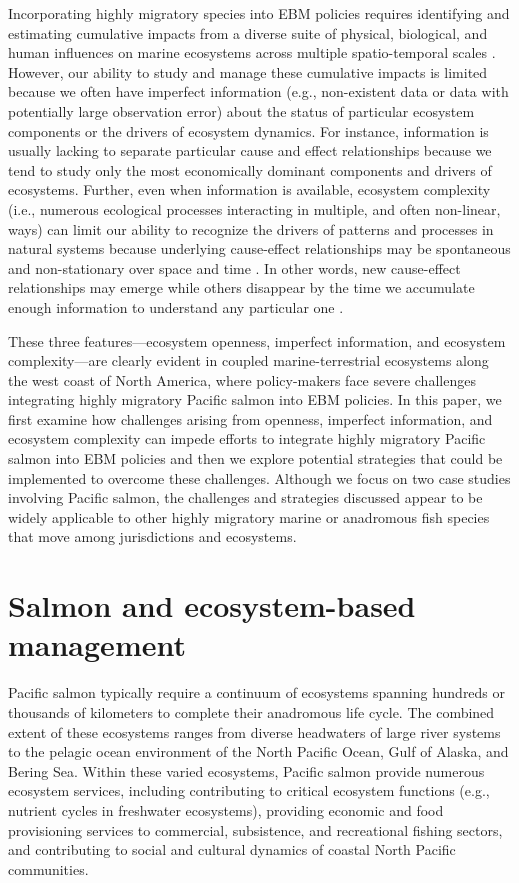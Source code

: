 Incorporating highly migratory species into EBM policies requires identifying
and estimating cumulative impacts from a diverse suite of physical, biological,
and human influences on marine ecosystems across multiple spatio-temporal scales
\citep{Lascelles2014, Halpern2008a}. However, our ability to study and manage
these cumulative impacts is limited because we often have imperfect information
(e.g., non-existent data or data with potentially large observation error) about
the status of particular ecosystem components or the drivers of ecosystem
dynamics. For instance, information is usually lacking to separate particular
cause and effect relationships because we tend to study only the most
economically dominant components and drivers of ecosystems. Further, even when
information is available, ecosystem complexity (i.e., numerous ecological
processes interacting in multiple, and often non-linear, ways) can limit our
ability to recognize the drivers of patterns and processes in natural systems
because underlying cause-effect relationships may be spontaneous and
non-stationary over space and time \citep{Hsieh2005a, Burkett2005a,
Scheffer2001a}. In other words, new cause-effect relationships may emerge while
others disappear by the time we accumulate enough information to understand any
particular one \citep{Myers1998b}.

These three features---ecosystem openness, imperfect information, and ecosystem
complexity---are clearly evident in coupled marine-terrestrial ecosystems along
the west coast of North America, where policy-makers face severe challenges
integrating highly migratory Pacific salmon into EBM policies. In this paper, we
first examine how challenges arising from openness, imperfect information, and
ecosystem complexity can impede efforts to integrate highly migratory Pacific
salmon into EBM policies and then we explore potential strategies that could be
implemented to overcome these challenges. Although we focus on two case studies
involving Pacific salmon, the challenges and strategies discussed appear to be
widely applicable to other highly migratory marine or anadromous fish species
that move among jurisdictions and ecosystems.



\section{Salmon and ecosystem-based management}

Pacific salmon typically require a continuum of ecosystems spanning hundreds or
thousands of kilometers to complete their anadromous life cycle. The combined
extent of these ecosystems ranges from diverse headwaters of large river systems
to the pelagic ocean environment of the North Pacific Ocean, Gulf of Alaska, and
Bering Sea. Within these varied ecosystems, Pacific salmon provide numerous
ecosystem services, including contributing to critical ecosystem functions
(e.g., nutrient cycles in freshwater ecosystems), providing economic and food
provisioning services to commercial, subsistence, and recreational fishing
sectors, and contributing to social and cultural dynamics of coastal North
Pacific communities.

